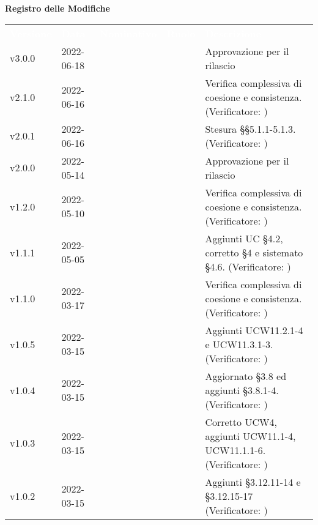 
{\LARGE{\textbf{Registro delle Modifiche}}} \\
\renewcommand{\arraystretch}{1.5}
\begin{longtable}{ m{}<{\centering}  m{}<{\centering}  m{}<{\centering}  m{}<{\centering}  m{}<{\centering} }
	\rowcolor{darkblue}
	\textcolor{white}{\textbf{Versione}} &\textcolor{white}{\textbf{Data}}& \textcolor{white}{\textbf{Nominativo}} & \textcolor{white}{\textbf{Ruolo}}&\textcolor{white}{\textbf{Descrizione}}\\
	
	v3.0.0 & 2022-06-18 & \MG & \RE & Approvazione per il rilascio \\

	v2.1.0 & 2022-06-16 & \FP & \AN & Verifica complessiva di coesione e consistenza. (Verificatore: \textit{\PV}) \\

	v2.0.1 & 2022-06-16 & \FP & \AN{} & Stesura §§5.1.1-5.1.3. (Verificatore: \textit{\PV})  \\

	v2.0.0 & 2022-05-14 & \MG & \RE & Approvazione per il rilascio \\

	v1.2.0 & 2022-05-10 & \GC & \AN & Verifica complessiva di coesione e consistenza. (Verificatore: \textit{\PV}) \\

	v1.1.1 & 2022-05-05& \GC & \AN{} & Aggiunti UC \S{}4.2, corretto \S{}4 e sistemato \S{}4.6. (Verificatore: \textit{\PV})  \\	

	v1.1.0 & 2022-03-17 & \FP & \AN & Verifica complessiva di coesione e consistenza. (Verificatore: \textit{\PV}) \\	

	v1.0.5 & 2022-03-15& \LW & \AN{} & Aggiunti UCW11.2.1-4 e UCW11.3.1-3. (Verificatore: \textit{\PV})  \\

	v1.0.4 & 2022-03-15& \FP & \AN{} & Aggiornato \S{}3.8 ed aggiunti \S{}3.8.1-4. (Verificatore: \textit{\PV})  \\

	v1.0.3 & 2022-03-15& \GC & \AN{} & Corretto UCW4, aggiunti UCW11.1-4, UCW11.1.1-6. (Verificatore: \textit{\PV})  \\

	v1.0.2 & 2022-03-15& \LW & \AN{} & Aggiunti \S{}3.12.11-14 e \S{}3.12.15-17 (Verificatore: \textit{\PV})  \\


\end{longtable}
